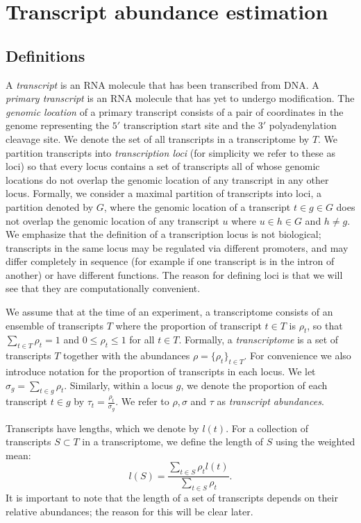 \documentclass[12pt]{amsart}
\theoremstyle{definition}
\begin{document}
\newpage
\section{Transcript abundance estimation \label{abundances}}
\label{sec:abundances}

\subsection{Definitions}

A {\em transcript} is an RNA molecule that has been transcribed from DNA. A
{\em primary transcript} is an RNA molecule that has yet to undergo
modification. The {\em genomic location} of a primary transcript consists of a
pair of coordinates in the genome representing the $5'$ transcription start
site and the $3'$ polyadenylation cleavage site. We denote the set of all
transcripts in a transcriptome by $T$. We partition transcripts into {\em
transcription loci} (for simplicity we refer to these as loci) so that every
locus contains a set of transcripts all of whose genomic locations do not
overlap the genomic location of any transcript in any other locus. Formally,
we consider a maximal partition of transcripts into loci, a partition denoted
by $G$, where the genomic location of a transcript $t \in g \in G$ does not
overlap the genomic location of any transcript $u $ where $u \in h \in G$ and
$h \neq g$. We emphasize that the definition of a transcription locus is not
biological; transcripts in the same locus may be regulated via different
promoters, and may differ completely in sequence (for example if one
transcript is in the intron of another) or have different functions. The
reason for defining loci is that we will see that they are computationally
convenient.


We assume that at the time of an experiment, a transcriptome consists of an
ensemble of transcripts $T$ where the proportion of transcript $t \in T$ is
$\rho_t$, so that $\sum_{t \in T} \rho_t = 1$ and $0 \leq \rho_t \leq 1$ for
all $t \in T$. Formally, a {\em transcriptome} is a set of transcripts $T$
together with the abundances $\rho=\{ \rho_t\}_{t \in T}$. For convenience we also introduce
notation for the proportion of transcripts in each locus. We let $\sigma_g =
\sum_{t \in g} \rho_t$. Similarly, within a locus $g$, we denote the
proportion of each transcript $t \in g$ by $\tau_t = \frac{\rho_t}{\sigma_g}$.
We refer to $\rho,\sigma$ and $\tau$ as {\em transcript abundances}.


Transcripts have lengths, which we denote by $l(t)$. For a collection of transcripts $S \subset T$ in a transcriptome, we define the length of $S$ using the weighted mean:
\begin{equation}
\label{eq:effective_length}
l(S) =\frac{\sum_{t \in S} \rho_tl(t)}{\sum_{t \in S}\rho_t}.
\end{equation}
It is important to note that the length of a set of transcripts depends on their relative abundances; the reason for this will be clear later. 
\end{document}
